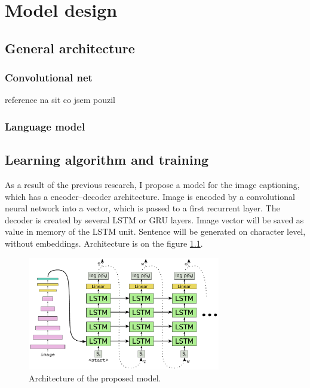 \chapter{Model design}\label{chp:model}

\section{General architecture}
\subsection{Convolutional net}
reference na sit co jsem pouzil \cite{DBLP:journals/corr/SimonyanZ14a}
\subsection{Language model}
\section{Learning algorithm and training}
As a result of the previous research, I propose a model for the image captioning, which has a encoder--decoder architecture. Image is encoded by a convolutional neural network into a vector, which is passed to a first recurrent layer. The decoder is created by several LSTM or GRU layers. Image vector will be saved as value in memory of the LSTM unit. Sentence will be generated on character level, without embeddings. Architecture is on the figure \ref{fig:proposedModel}.

\begin{figure}[!t]
	\centering
	\includegraphics[width=0.75\textwidth]{./fig/proposed-model.pdf}
	\caption{Architecture of the proposed model.
		\label{fig:proposedModel}}
\end{figure}

